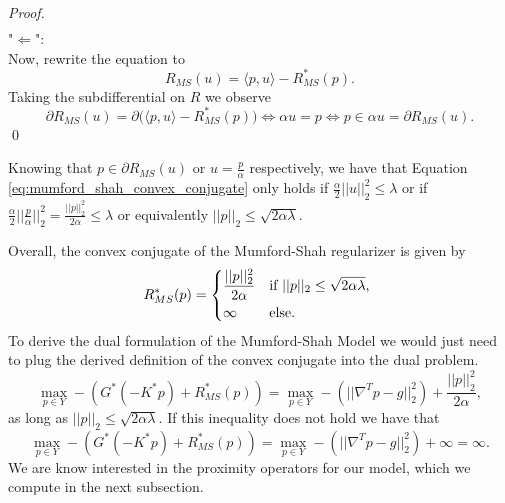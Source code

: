 \begin{enumerate}
\begin{proof}
\begin{eqnarray}
                            \end{eqnarray}
                        "$\Longleftarrow$":\\
                        Now, rewrite the equation to
                            $$
                                R_{MS}(u) = \langle p, u \rangle - R_{MS}^{\ast}(p).
                            $$
                        Taking the subdifferential on $R$ we observe
                            $$
                                \partial R_{MS}(u) = \partial \bigg( \langle p, u \rangle - R_{MS}^{\ast}(p) \bigg) \Longleftrightarrow \alpha u = p \Longleftrightarrow p \in \alpha u = \partial R_{MS}(u).
                            $$
                        \qed
                    \end{proof}
                Knowing that $p \in \partial R_{MS}(u)$ or $u = \frac{p}{\alpha}$ respectively, we have that Equation \ref{eq:mumford_shah_convex_conjugate} only holds if $\frac{\alpha}{2} ||u||_{2}^{2} \le \lambda$ or if $\frac{\alpha}{2} ||\frac{p}{\alpha}||_{2}^{2} = \frac{||p||_{2}^{2}}{2\alpha} \le \lambda$ or equivalently $||p||_{2} \le \sqrt{2 \alpha \lambda}$.
            \end{enumerate}
        Overall, the convex conjugate of the Mumford-Shah regularizer is given by
            \begin{equation}
                R_{MS}^{\ast}(p) =
                    \begin{dcases*}
                        \frac{||p||_{2}^{2}}{2\alpha} & \textnormal{if $||p||_{2} \le \sqrt{2 \alpha \lambda}$,} \\
                        \infty & \textnormal{else.}
                    \end{dcases*}
            \end{equation}
        To derive the dual formulation of the Mumford-Shah Model we would just need to plug the derived definition of the convex conjugate into the dual problem.
            \begin{equation}
                \max_{p \in Y} - (G^{\ast}(-K^{\ast}p) + R_{MS}^{\ast}(p)) = \max_{p \in Y} -(||\nabla^{T}p - g||_{2}^{2}) + \frac{||p||_{2}^{2}}{2\alpha},
            \label{eq:dual_mumford_shah_model}
            \end{equation}
        as long as $||p||_{2} \le \sqrt{2 \alpha \lambda}$. If this inequality does not hold we have that
            $$
                \max_{p \in Y} - (G^{\ast}(-K^{\ast}p) + R_{MS}^{\ast}(p)) = \max_{p \in Y} -(||\nabla^{T}p - g||_{2}^{2}) + \infty = \infty.
            $$
        We are know interested in the proximity operators for our model, which we compute in the next subsection.

